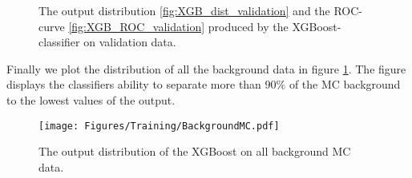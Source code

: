\documentclass{article}
\begin{document}
\newline
\begin{figure}
    \caption{The output distribution \ref{fig:XGB_dist_validation} and the ROC-curve \ref{fig:XGB_ROC_validation} produced by the XGBoost-classifier on validation data.}
\end{figure}
Finally we plot the distribution of all the background data in figure \ref{fig:XGB_dist_background}. The figure displays the classifiers ability to separate more than $90\%$ of the MC background to the lowest values of the output. 
\begin{figure}
    \centering
    \texttt{[image: Figures/Training/BackgroundMC.pdf]}
    \caption{The output distribution of the XGBoost on all background MC data.}
    \label{fig:XGB_dist_background}
\end{figure}
\end{document}
